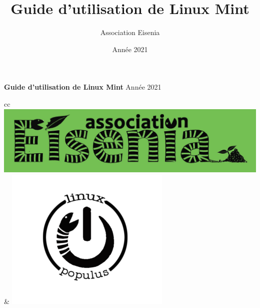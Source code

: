 \documentclass[12pt]{article}
\title{Guide d'utilisation de Linux Mint}
\author{Association Eisenia}
\date{Année 2021}
\begin{document}
	\centering
	\vspace*{3cm}
	\textbf{\Huge{Guide d'utilisation de Linux Mint}}\newline
	\newline
	\Large{Année 2021}
	\newline
	\vfill
		\begin{tabular}{cc}
			\hline
			\\
			\includegraphics[width=.72\textwidth]{../include/logo.jpg}&
			\includegraphics[width=.24\textwidth]{../include/linuxpop.png}\\\hline
		\end{tabular}
\end{document}
